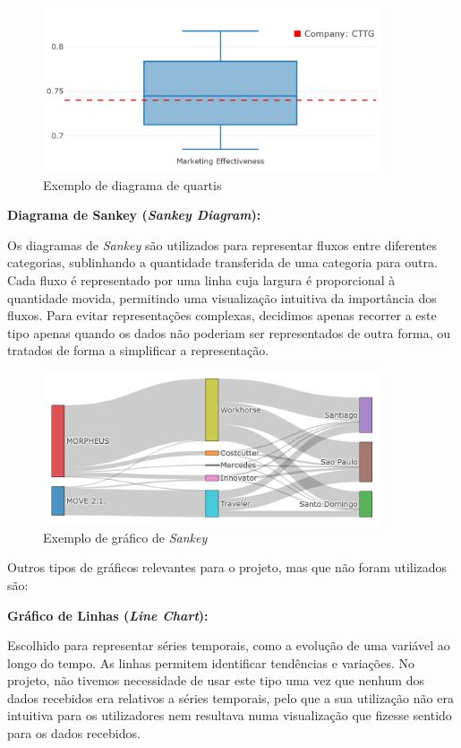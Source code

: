 \begin{figure}[H]
    \centering
    \includegraphics[max width=10cm]{./img/box}
    \caption{Exemplo de diagrama de quartis}
\end{figure}

\textbf{Diagrama de Sankey (\textit{Sankey Diagram}):}

Os diagramas de \textit{Sankey} são utilizados para representar fluxos entre diferentes categorias, sublinhando a quantidade transferida de uma categoria para outra. Cada fluxo é representado por uma linha cuja largura é proporcional à quantidade movida, permitindo uma visualização intuitiva da importância dos fluxos. Para evitar representações complexas, decidimos apenas recorrer a este tipo apenas quando os dados não poderiam ser representados de outra forma, ou tratados de forma a simplificar a representação.

\begin{figure}[H]
    \centering
    \includegraphics[max width=10cm]{./img/skankey}
    \caption{Exemplo de gráfico de \textit{Sankey}}
\end{figure}

Outros tipos de gráficos relevantes para o projeto, mas que não foram utilizados são:

\textbf{Gráfico de Linhas (\textit{Line Chart}):}  

Escolhido para representar séries temporais, como a evolução de uma variável ao longo do tempo. As linhas permitem identificar tendências e variações. No projeto, não tivemos necessidade de usar este tipo uma vez que nenhum dos dados recebidos era relativos a séries temporais, pelo que a sua utilização não era intuitiva para os utilizadores nem resultava numa visualização que fizesse sentido para os dados recebidos.

